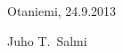\documentclass[finnish,12pt,a4paper,pdftex]{article}
\begin{document}




\vspace{5cm}
Otaniemi, 24.9.2013

\vspace{5mm}
{\hfill Juho T.\ Salmi \hspace{1cm}}

\newpage


\thesistableofcontents


%
\end{document}
